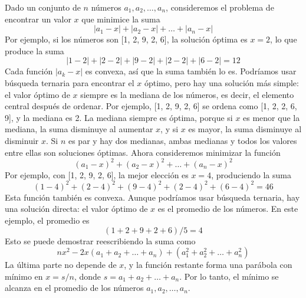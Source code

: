 {}\markdownRendererInterblockSeparator
{}
\markdownRendererSectionEnd \markdownRendererSectionBegin
{}\markdownRendererInterblockSeparator
{}Dado un conjunto de $n$ números $a_1, a_2, \dots, a_n$, consideremos el problema de encontrar un valor $x$ que minimice la suma\markdownRendererParagraphSeparator
{}$$|a_1 - x| + |a_2 - x| + \dots + |a_n - x|$$\markdownRendererParagraphSeparator
{}Por ejemplo, si los números son [1, 2, 9, 2, 6], la solución óptima es $x = 2$, lo que produce la suma\markdownRendererParagraphSeparator
{}$$|1-2| + |2-2| + |9-2| + |2-2| + |6-2| = 12$$\markdownRendererParagraphSeparator
{}Cada función $|a_k - x|$ es convexa, así que la suma también lo es. Podríamos usar búsqueda ternaria para encontrar el $x$ óptimo, pero hay una solución más simple: el valor óptimo de $x$ siempre es la mediana de los números, es decir, el elemento central después de ordenar. Por ejemplo, [1, 2, 9, 2, 6] se ordena como [1, 2, 2, 6, 9], y la mediana es 2.\markdownRendererParagraphSeparator
{}La mediana siempre es óptima, porque si $x$ es menor que la mediana, la suma disminuye al aumentar $x$, y si $x$ es mayor, la suma disminuye al disminuir $x$. Si $n$ es par y hay dos medianas, ambas medianas y todos los valores entre ellas son soluciones óptimas.\markdownRendererParagraphSeparator
{}Ahora consideremos minimizar la función\markdownRendererParagraphSeparator
{}$$(a_1 - x)^2 + (a_2 - x)^2 + \dots + (a_n - x)^2$$\markdownRendererParagraphSeparator
{}Por ejemplo, con [1, 2, 9, 2, 6], la mejor elección es $x = 4$, produciendo la suma\markdownRendererParagraphSeparator
{}$$(1-4)^2 + (2-4)^2 + (9-4)^2 + (2-4)^2 + (6-4)^2 = 46$$\markdownRendererParagraphSeparator
{}Esta función también es convexa. Aunque podríamos usar búsqueda ternaria, hay una solución directa: el valor óptimo de $x$ es el promedio de los números. En este ejemplo, el promedio es\markdownRendererParagraphSeparator
{}$$(1 + 2 + 9 + 2 + 6)/5 = 4$$\markdownRendererParagraphSeparator
{}Esto se puede demostrar reescribiendo la suma como\markdownRendererParagraphSeparator
{}$$n x^2 - 2x(a_1 + a_2 + \dots + a_n) + (a_1^2 + a_2^2 + \dots + a_n^2)$$\markdownRendererParagraphSeparator
{}La última parte no depende de $x$, y la función restante forma una parábola con mínimo en $x = s/n$, donde $s = a_1 + a_2 + \dots + a_n$. Por lo tanto, el mínimo se alcanza en el promedio de los números $a_1, a_2, \dots, a_n$.\markdownRendererInterblockSeparator
{}
\markdownRendererSectionEnd 
\markdownRendererSectionEnd 
\markdownRendererSectionEnd \markdownRendererDocumentEnd